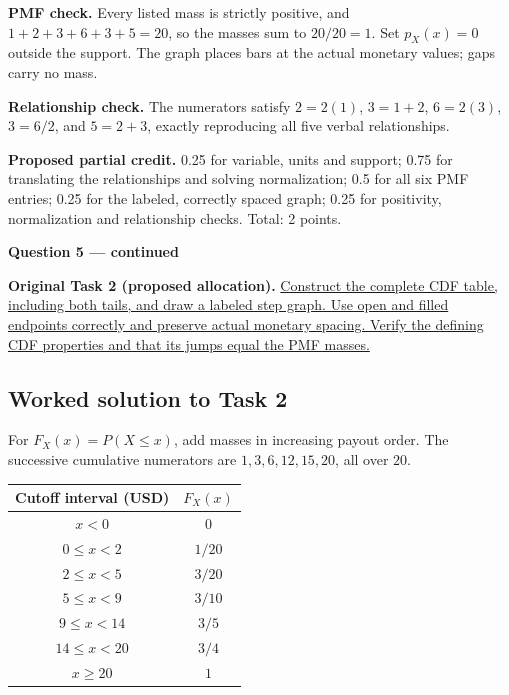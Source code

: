 \textbf{PMF check.} Every listed mass is strictly positive, and $1+2+3+6+3+5=20$, so the masses sum to $20/20=1$. Set $p_X(x)=0$ outside the support. The graph places bars at the actual monetary values; gaps carry no mass.

\textbf{Relationship check.} The numerators satisfy $2=2(1)$, $3=1+2$, $6=2(3)$, $3=6/2$, and $5=2+3$, exactly reproducing all five verbal relationships.

\textbf{Proposed partial credit.} 0.25 for variable, units and support; 0.75 for translating the relationships and solving normalization; 0.5 for all six PMF entries; 0.25 for the labeled, correctly spaced graph; 0.25 for positivity, normalization and relationship checks. Total: 2 points.

\par\vspace{3mm}\secInicio[][sec:q5]

\clearpage
\textbf{Question 5 --- continued}

\textbf{Original Task 2 (proposed allocation).} \hyperref[sol:q5t2]{Construct the complete CDF table, including both tails, and draw a labeled step graph. Use open and filled endpoints correctly and preserve actual monetary spacing. Verify the defining CDF properties and that its jumps equal the PMF masses.} 


\subsection*{Worked solution to Task 2 }
\label{sol:q5t2}

For $F_X(x)=P(X\leq x)$, add masses in increasing payout order. The successive cumulative numerators are $1,3,6,12,15,20$, all over $20$.

\begin{center}
\begin{tabular}{cc}\toprule
Cutoff interval (USD) & $F_X(x)$\\\midrule
$x<0$ & $0$\\
$0\leq x<2$ & $1/20$\\
$2\leq x<5$ & $3/20$\\
$5\leq x<9$ & $3/10$\\
$9\leq x<14$ & $3/5$\\
$14\leq x<20$ & $3/4$\\
$x\geq 20$ & $1$\\
\bottomrule\end{tabular}
\end{center}


